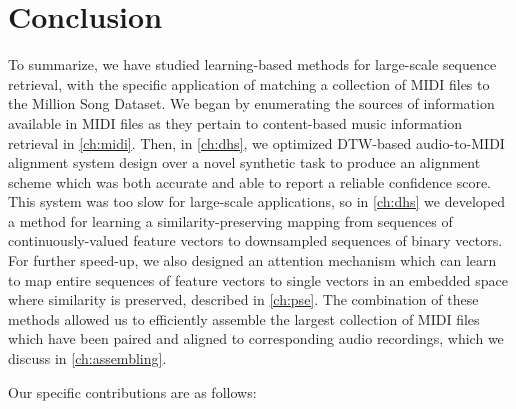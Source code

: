\chapter{Conclusion}
\label{ch:conclusion}

To summarize, we have studied learning-based methods for large-scale sequence retrieval, with the specific application of matching a collection of MIDI files to the Million Song Dataset.
We began by enumerating the sources of information available in MIDI files as they pertain to content-based music information retrieval in \cref{ch:midi}.
Then, in \cref{ch:dhs}, we optimized DTW-based audio-to-MIDI alignment system design over a novel synthetic task to produce an alignment scheme which was both accurate and able to report a reliable confidence score.
This system was too slow for large-scale applications, so in \cref{ch:dhs} we developed a method for learning a similarity-preserving mapping from sequences of continuously-valued feature vectors to downsampled sequences of binary vectors.
For further speed-up, we also designed an attention mechanism which can learn to map entire sequences of feature vectors to single vectors in an embedded space where similarity is preserved, described in \cref{ch:pse}.
The combination of these methods allowed us to efficiently assemble the largest collection of MIDI files which have been paired and aligned to corresponding audio recordings, which we discuss in \cref{ch:assembling}.

Our specific contributions are as follows:

